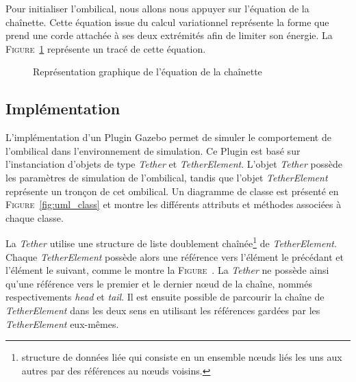    Pour initialiser l'ombilical, nous allons nous appuyer sur l'équation de la chaînette. Cette équation issue du calcul variationnel représente la forme que prend une corde attachée à ses deux extrémités afin de limiter son énergie. La \textsc{Figure}~\ref{fig:chainette} représente un tracé de cette équation.

    \begin{figure}[!htb]
        \centering
        \caption{Représentation graphique de l'équation de la chaînette}
        \label{fig:chainette}
    \end{figure}
    

\subsection{Implémentation}
    L'implémentation d'un \gls{Plugin} \gls{Gazebo} permet de simuler le comportement de l'ombilical dans l'environnement de simulation. Ce \gls{Plugin} est basé sur l'instanciation d'objets de type \textit{Tether} et \textit{TetherElement}. L'objet \textit{Tether} possède les paramètres de simulation de l'ombilical, tandis que l'objet \textit{TetherElement} représente un tronçon de cet ombilical. Un diagramme de classe est présenté en \textsc{Figure}~\ref{fig:uml_class} et montre les différents attributs et méthodes associées à chaque classe.
    
    La \textit{Tether} utilise une structure de liste doublement chaînée\footnote{structure de données liée qui consiste en un ensemble n\oe uds liés les uns aux autres par des références au n\oe uds voisins.} de \textit{TetherElement}. Chaque \textit{TetherElement} possède alors une référence vers l'élément le précédant et l'élément le suivant, comme le montre la \textsc{Figure}~\label{fig:goubly_linked_list}. La \textit{Tether} ne possède ainsi qu'une référence vers le premier et le dernier n\oe ud de la chaîne, nommés respectivements \textit{head} et \textit{tail}. Il est ensuite possible de parcourir la chaîne de \textit{TetherElement} dans les deux sens en utilisant les références gardées par les \textit{TetherElement} eux-mêmes. 

